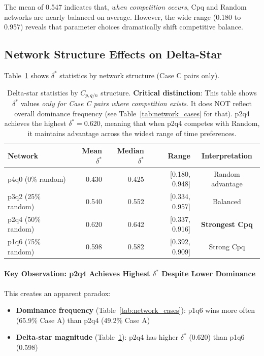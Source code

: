 \documentclass[12pt,a4paper]{article}
\begin{document}
The mean of 0.547 indicates that, \textit{when competition occurs}, Cpq and Random networks are nearly balanced on average. However, the wide range (0.180 to 0.957) reveals that parameter choices dramatically shift competitive balance.

\subsection{Network Structure Effects on Delta-Star}

Table~\ref{tab:deltastar_by_network} shows $\delta^*$ statistics by network structure (Case C pairs only).

\begin{table}[H]
\centering
\begin{tabular}{@{}lrrrc@{}}
\toprule
\textbf{Network} & \textbf{Mean $\delta^*$} & \textbf{Median $\delta^*$} & \textbf{Range} & \textbf{Interpretation} \\
\midrule
p4q0 (0\% random)  & 0.430 & 0.425 & [0.180, 0.948] & Random advantage \\
p3q2 (25\% random) & 0.540 & 0.552 & [0.334, 0.957] & Balanced \\
p2q4 (50\% random) & 0.620 & 0.642 & [0.337, 0.916] & \textbf{Strongest Cpq} \\
p1q6 (75\% random) & 0.598 & 0.582 & [0.392, 0.909] & Strong Cpq \\
\bottomrule
\end{tabular}
\caption{Delta-star statistics by $C_{p,q/n}$ structure. \textbf{Critical distinction}: This table shows $\delta^*$ values \textit{only for Case C pairs where competition exists}. It does NOT reflect overall dominance frequency (see Table~\ref{tab:network_cases} for that). p2q4 achieves the highest $\delta^* = 0.620$, meaning that when p2q4 competes with Random, it maintains advantage across the widest range of time preferences.}
\label{tab:deltastar_by_network}
\end{table}

\paragraph{Key Observation: p2q4 Achieves Highest $\delta^*$ Despite Lower Dominance}

This creates an apparent paradox:
\begin{itemize}
    \item \textbf{Dominance frequency} (Table~\ref{tab:network_cases}): p1q6 wins more often (65.9\% Case A) than p2q4 (49.2\% Case A)
    \item \textbf{Delta-star magnitude} (Table~\ref{tab:deltastar_by_network}): p2q4 has higher $\delta^*$ (0.620) than p1q6 (0.598)
\end{itemize}
\end{document}
